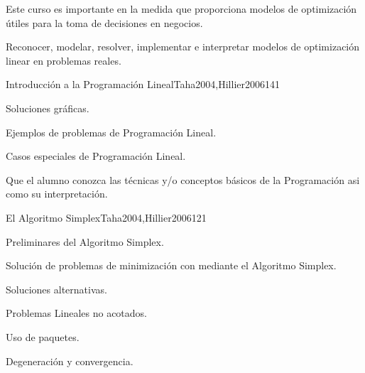 \begin{syllabus}


\begin{justification}
Este curso es importante en la medida que proporciona modelos de optimización útiles para la toma de decisiones en negocios.
\end{justification}

\begin{goals}
\item Reconocer, modelar, resolver, implementar e interpretar modelos de optimización linear en problemas reales.
\end{goals}

\begin{outcomes}
\end{outcomes}

\begin{unit}{Introducción a la Programación Lineal}{Taha2004,Hillier2006}{14}{1}
   \begin{topics}
      \item Soluciones gráficas.
      \item Ejemplos de problemas de Programación Lineal.
      \item Casos especiales de Programación Lineal.
   \end{topics}

   \begin{learningoutcomes}
      \item Que el alumno conozca las técnicas y/o conceptos básicos de la Programación asi como su interpretación.
   \end{learningoutcomes}
\end{unit}

\begin{unit}{El Algoritmo Simplex}{Taha2004,Hillier2006}{12}{1}
   \begin{topics}
      \item Preliminares del Algoritmo Simplex.
      \item Solución de problemas de minimización con mediante el Algoritmo Simplex.
      \item Soluciones alternativas.
      \item Problemas Lineales no acotados.
      \item Uso de paquetes.
      \item Degeneración y convergencia.
   \end{topics}


\end{unit}
\end{syllabus}
